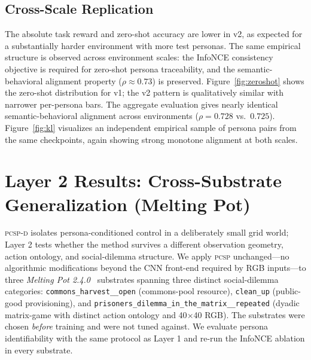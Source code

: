 \documentclass[conference]{IEEEtran}
\newcommand{\PCSP}{\textsc{pcsp}\xspace}
\newcommand{\PCSPD}{\textsc{pcsp-d}\xspace}
\begin{document}
\subsection{Cross-Scale Replication}

The absolute task reward and zero-shot accuracy are lower in v2, as expected for
a substantially harder environment with more test personas.
The same empirical structure is observed across environment scales: the InfoNCE
consistency objective is required for zero-shot persona traceability, and the
semantic-behavioral alignment property ($\rho \approx 0.73$) is preserved.
Figure~\ref{fig:zeroshot} shows the zero-shot distribution for v1;
the v2 pattern is qualitatively similar with narrower per-persona bars.
The aggregate evaluation gives nearly identical semantic-behavioral alignment
across environments ($\rho\!=\!0.728$ vs.\ $0.725$). Figure~\ref{fig:kl}
visualizes an independent empirical sample of persona pairs from the same
checkpoints, again showing strong monotone alignment at both scales.


\section{Layer 2 Results: Cross-Substrate Generalization (Melting Pot)}
\label{sec:meltingpot}

\PCSPD{} isolates persona-conditioned control in a deliberately small grid
world; Layer 2 tests whether the method survives a different observation
geometry, action ontology, and social-dilemma structure. We apply \PCSP{}
unchanged---no algorithmic modifications beyond the CNN front-end required
by RGB inputs---to three \textit{Melting Pot
2.4.0}~\cite{leibo2021meltingpot} substrates spanning three distinct
social-dilemma categories: \texttt{commons\_harvest\_\_open} (commons-pool
resource), \texttt{clean\_up} (public-good provisioning), and
\texttt{prisoners\_dilemma\_in\_the\_matrix\_\_repeated} (dyadic
matrix-game with distinct action ontology and 40$\times$40 RGB). The
substrates were chosen \emph{before} training and were not tuned against.
We evaluate persona identifiability with the same protocol as Layer 1 and
re-run the InfoNCE ablation in every substrate.
\end{document}

